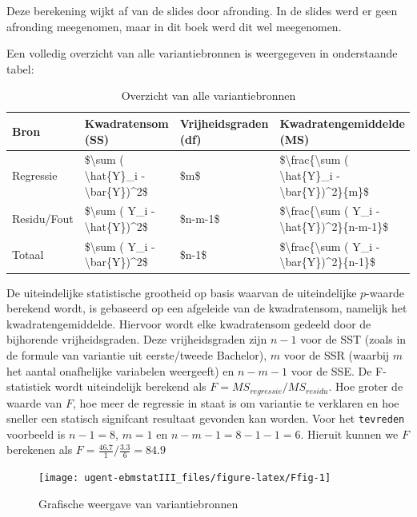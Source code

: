 \documentclass[
]{book}
\theoremstyle{definition}
\theoremstyle{definition}
\theoremstyle{definition}
\theoremstyle{definition}
\theoremstyle{remark}
\begin{document}
Deze berekening wijkt af van de slides door afronding. In de slides werd er geen afronding meegenomen, maar in dit boek werd dit wel meegenomen.

Een volledig overzicht van alle variantiebronnen is weergegeven in onderstaande tabel:

\begin{table}

\caption{\label{tab:unnamed-chunk-13}Overzicht van alle variantiebronnen}
\centering
\begin{tabular}[t]{llll}
\toprule
Bron & Kwadratensom (SS) & Vrijheidsgraden (df) & Kwadratengemiddelde (MS)\\
\midrule
Regressie & \$\textbackslash{}sum ( \textbackslash{}hat\{Y\}\_i - \textbackslash{}bar\{Y\})\textasciicircum{}2\$ & \$m\$ & \$\textbackslash{}frac\{\textbackslash{}sum ( \textbackslash{}hat\{Y\}\_i - \textbackslash{}bar\{Y\})\textasciicircum{}2\}\{m\}\$\\
Residu/Fout & \$\textbackslash{}sum ( Y\_i - \textbackslash{}hat\{Y\})\textasciicircum{}2\$ & \$n-m-1\$ & \$\textbackslash{}frac\{\textbackslash{}sum ( Y\_i - \textbackslash{}hat\{Y\})\textasciicircum{}2\}\{n-m-1\}\$\\
Totaal & \$\textbackslash{}sum ( Y\_i - \textbackslash{}bar\{Y\})\textasciicircum{}2\$ & \$n-1\$ & \$\textbackslash{}frac\{\textbackslash{}sum ( Y\_i - \textbackslash{}bar\{Y\})\textasciicircum{}2\}\{n-1\}\$\\
\bottomrule
\end{tabular}
\end{table}

De uiteindelijke statistische grootheid op basis waarvan de uiteindelijke \(p\)-waarde berekend wordt, is gebaseerd op een afgeleide van de kwadratensom, namelijk het kwadratengemiddelde. Hiervoor wordt elke kwadratensom gedeeld door de bijhorende vrijheidsgraden. Deze vrijheidsgraden zijn \(n-1\) voor de SST (zoals in de formule van variantie uit eerste/tweede Bachelor), \(m\) voor de SSR (waarbij \(m\) het aantal onafhelijke variabelen weergeeft) en \(n-m-1\) voor de SSE. De F-statistiek wordt uiteindelijk berekend als \(F = MS_{regressie}/MS_{residu}\). Hoe groter de waarde van \(F\), hoe meer de regressie in staat is om variantie te verklaren en hoe sneller een statisch signifcant resultaat gevonden kan worden. Voor het \texttt{tevreden} voorbeeld is \(n-1 = 8\), \(m = 1\) en \(n-m-1 = 8-1-1 = 6\). Hieruit kunnen we \(F\) berekenen als \(F = \frac{46.7}{1}/\frac{3.3}{6} = 84.9\)

\begin{figure}
\texttt{[image: ugent-ebmstatIII\_files/figure-latex/Ffig-1]} \caption{Grafische weergave van variantiebronnen}\label{fig:Ffig}
\end{figure}
\end{document}

